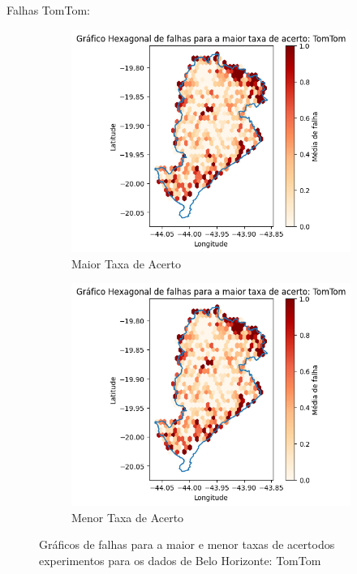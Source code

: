 Falhas TomTom:

\begin{figure}[ht]
  \centering
  \begin{subfigure}[b]{0.45\textwidth}
    \includegraphics[width=\textwidth]{Figuras/expFalhasTomtommaior.png}
    \caption{Maior Taxa de Acerto}
    \label{fig:falhastomtomBHexpMaior}
  \end{subfigure}
  \hfill
  \begin{subfigure}[b]{0.45\textwidth}
    \includegraphics[width=\textwidth]{Figuras/expFalhasTomtommenor.png}
    \caption{Menor Taxa de Acerto}
    \label{fig:falhastomtomBHexpMenor}
  \end{subfigure}
  
  \caption{Gráficos de falhas para a maior e menor taxas de acertodos experimentos para os dados de Belo Horizonte: TomTom}
  \label{fig:falhas-exp-tomtom}
\end{figure}


